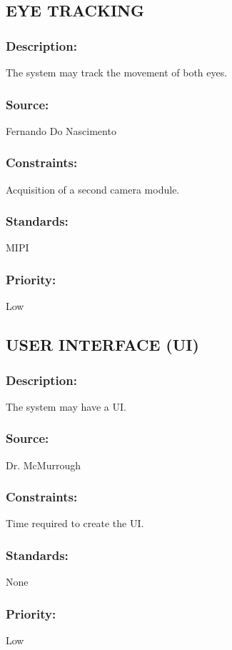 \subsection{\text EYE TRACKING}
\subsubsection{Description:} 
	{The system may track the movement of both eyes.}
\subsubsection{Source:} 
	{Fernando Do Nascimento}
\subsubsection{Constraints:} 
	{Acquisition of a second camera module.}
\subsubsection{Standards:} 
	{MIPI}
\subsubsection{Priority:} 
	{Low}
\newline
\newline
	
\subsection{\text USER INTERFACE (UI)}
\subsubsection{Description:} 
	{The system may have a UI.} 
\subsubsection{Source:} 
	{Dr. McMurrough}
\subsubsection{Constraints:} 
	{Time required to create the UI.}
\subsubsection{Standards:} 
	{None}
\subsubsection{Priority:} 
	{Low}
\newline
\newline
	
